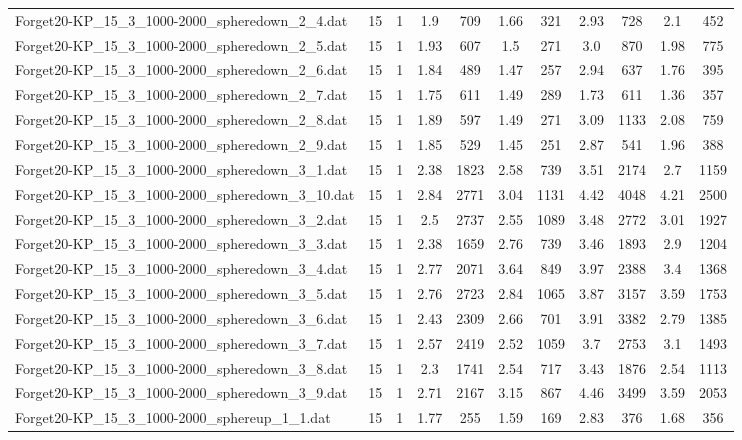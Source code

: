 \begin{table}[!ht]
\begin{tabular}{lcccccccccc}
Forget20-KP\_15\_3\_1000-2000\_spheredown\_2\_4.dat & 15 & 1 & 1.9 & 709 & 1.66 & 321 & 2.93 & 728 & 2.1 & 452 \\
Forget20-KP\_15\_3\_1000-2000\_spheredown\_2\_5.dat & 15 & 1 & 1.93 & 607 & 1.5 & 271 & 3.0 & 870 & 1.98 & 775 \\
Forget20-KP\_15\_3\_1000-2000\_spheredown\_2\_6.dat & 15 & 1 & 1.84 & 489 & 1.47 & 257 & 2.94 & 637 & 1.76 & 395 \\
Forget20-KP\_15\_3\_1000-2000\_spheredown\_2\_7.dat & 15 & 1 & 1.75 & 611 & 1.49 & 289 & 1.73 & 611 & 1.36 & 357 \\
Forget20-KP\_15\_3\_1000-2000\_spheredown\_2\_8.dat & 15 & 1 & 1.89 & 597 & 1.49 & 271 & 3.09 & 1133 & 2.08 & 759 \\
Forget20-KP\_15\_3\_1000-2000\_spheredown\_2\_9.dat & 15 & 1 & 1.85 & 529 & 1.45 & 251 & 2.87 & 541 & 1.96 & 388 \\
Forget20-KP\_15\_3\_1000-2000\_spheredown\_3\_1.dat & 15 & 1 & 2.38 & 1823 & 2.58 & 739 & 3.51 & 2174 & 2.7 & 1159 \\
Forget20-KP\_15\_3\_1000-2000\_spheredown\_3\_10.dat & 15 & 1 & 2.84 & 2771 & 3.04 & 1131 & 4.42 & 4048 & 4.21 & 2500 \\
Forget20-KP\_15\_3\_1000-2000\_spheredown\_3\_2.dat & 15 & 1 & 2.5 & 2737 & 2.55 & 1089 & 3.48 & 2772 & 3.01 & 1927 \\
Forget20-KP\_15\_3\_1000-2000\_spheredown\_3\_3.dat & 15 & 1 & 2.38 & 1659 & 2.76 & 739 & 3.46 & 1893 & 2.9 & 1204 \\
Forget20-KP\_15\_3\_1000-2000\_spheredown\_3\_4.dat & 15 & 1 & 2.77 & 2071 & 3.64 & 849 & 3.97 & 2388 & 3.4 & 1368 \\
Forget20-KP\_15\_3\_1000-2000\_spheredown\_3\_5.dat & 15 & 1 & 2.76 & 2723 & 2.84 & 1065 & 3.87 & 3157 & 3.59 & 1753 \\
Forget20-KP\_15\_3\_1000-2000\_spheredown\_3\_6.dat & 15 & 1 & 2.43 & 2309 & 2.66 & 701 & 3.91 & 3382 & 2.79 & 1385 \\
Forget20-KP\_15\_3\_1000-2000\_spheredown\_3\_7.dat & 15 & 1 & 2.57 & 2419 & 2.52 & 1059 & 3.7 & 2753 & 3.1 & 1493 \\
Forget20-KP\_15\_3\_1000-2000\_spheredown\_3\_8.dat & 15 & 1 & 2.3 & 1741 & 2.54 & 717 & 3.43 & 1876 & 2.54 & 1113 \\
Forget20-KP\_15\_3\_1000-2000\_spheredown\_3\_9.dat & 15 & 1 & 2.71 & 2167 & 3.15 & 867 & 4.46 & 3499 & 3.59 & 2053 \\
Forget20-KP\_15\_3\_1000-2000\_sphereup\_1\_1.dat & 15 & 1 & 1.77 & 255 & 1.59 & 169 & 2.83 & 376 & 1.68 & 356 \\

\end{tabular}
\end{table}

